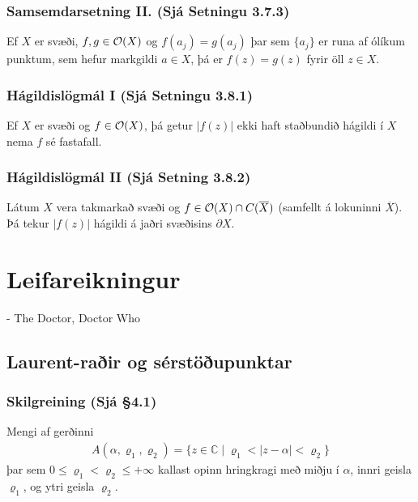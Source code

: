 \documentclass[a4paper,10pt,icelandic]{sphinxmanual}
\begin{document}
\subsection{Samsemdarsetning II. (Sjá Setningu 3.7.3)}
\label{\detokenize{Kafli03:samsemdarsetning-ii-sja-setningu-3-7-3}}
Ef \(X\) er svæði, \(f,g\in {\cal O}(X)\) og \(f(a_j)=g(a_j)\) þar sem \(\{a_j\}\) er runa af ólíkum punktum, sem hefur markgildi \(a\in X\), þá er \(f(z)=g(z)\) fyrir öll \(z\in X\).


\subsection{Hágildislögmál I (Sjá Setningu 3.8.1)}
\label{\detokenize{Kafli03:hagildislogmal-i-sja-setningu-3-8-1}}
Ef \(X\) er svæði og \(f\in {\cal O}(X)\), þá getur \(|f(z)|\) ekki haft staðbundið hágildi í \(X\) nema \(f\) sé fastafall.


\subsection{Hágildislögmál II (Sjá Setning 3.8.2)}
\label{\detokenize{Kafli03:hagildislogmal-ii-sja-setning-3-8-2}}
Látum \(X\) vera takmarkað svæði og \(f\in {\cal O}(X)\cap C(\overline X)\) (samfellt á lokuninni \(\overline X\)). Þá tekur \(|f(z)|\) hágildi á jaðri svæðisins \(\partial X\).


\chapter{Leifareikningur}
\label{\detokenize{Kafli04:leifareikningur}}\label{\detokenize{Kafli04::doc}}

- The Doctor, Doctor Who


\section{Laurent-raðir og sérstöðupunktar}
\label{\detokenize{Kafli04:laurent-rair-og-serstoupunktar}}

\subsection{Skilgreining (Sjá \S{}4.1)}
\label{\detokenize{Kafli04:skilgreining-sja-4-1}}
Mengi af gerðinni
\begin{equation*}
\begin{split}A(\alpha,\varrho_1,\varrho_2)=\{z\in {\mathbb{C}}\mid
\varrho_1<|z-\alpha|<\varrho_2\}\end{split}
\end{equation*}
þar sem \(0\leq\varrho_1<\varrho_2\leq +\infty\) kallast opinn hringkragi með miðju í \(\alpha\), innri geisla \(\varrho_1\), og ytri geisla \(\varrho_2\).
\end{document}
